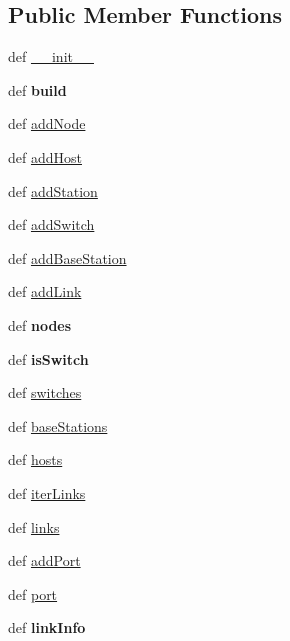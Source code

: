 \subsection*{Public Member Functions}
\begin{DoxyCompactItemize}
\item 
def \hyperlink{classmininet_1_1topo_1_1Topo_aa676f9d1a195133f173f73191aa3488b}{\-\_\-\-\_\-init\-\_\-\-\_\-}
\item 
\hypertarget{classmininet_1_1topo_1_1Topo_af49b0fef111262d6c0bd08e7977f9ffc}{def {\bfseries build}}\label{classmininet_1_1topo_1_1Topo_af49b0fef111262d6c0bd08e7977f9ffc}

\item 
def \hyperlink{classmininet_1_1topo_1_1Topo_ad49002a42e5525bbe9e0136d10d9b72d}{add\-Node}
\item 
def \hyperlink{classmininet_1_1topo_1_1Topo_a4649e48317e0b09f84ac5c6a88424194}{add\-Host}
\item 
def \hyperlink{classmininet_1_1topo_1_1Topo_acf5880d959db9ef7c3be45d1d6dfc72a}{add\-Station}
\item 
def \hyperlink{classmininet_1_1topo_1_1Topo_a8506ad67498aefb4a42ad1cd51576b38}{add\-Switch}
\item 
def \hyperlink{classmininet_1_1topo_1_1Topo_abf65ac2a53a0e0b0f27ac472723a1c37}{add\-Base\-Station}
\item 
def \hyperlink{classmininet_1_1topo_1_1Topo_ade9840eb4826cb17d5c6bc868e762fa3}{add\-Link}
\item 
\hypertarget{classmininet_1_1topo_1_1Topo_a4386138cc13f285c9c963367a492187d}{def {\bfseries nodes}}\label{classmininet_1_1topo_1_1Topo_a4386138cc13f285c9c963367a492187d}

\item 
\hypertarget{classmininet_1_1topo_1_1Topo_a47cc4a860b8806784fb84bb39f8212d8}{def {\bfseries is\-Switch}}\label{classmininet_1_1topo_1_1Topo_a47cc4a860b8806784fb84bb39f8212d8}

\item 
def \hyperlink{classmininet_1_1topo_1_1Topo_ac69689ade0c4416b7f1d726867e5034f}{switches}
\item 
def \hyperlink{classmininet_1_1topo_1_1Topo_a0f802790abc965ca8f775ae218e1dbb8}{base\-Stations}
\item 
def \hyperlink{classmininet_1_1topo_1_1Topo_a087a4818bbb5a1beba067fce4f009969}{hosts}
\item 
def \hyperlink{classmininet_1_1topo_1_1Topo_a900cec05bd380b32a60e0fc5371bcb29}{iter\-Links}
\item 
def \hyperlink{classmininet_1_1topo_1_1Topo_ad30a63eb5f3a910d331e33e34fe9adbb}{links}
\item 
def \hyperlink{classmininet_1_1topo_1_1Topo_ab83082737d1c8f4cba2da043a9ac91f9}{add\-Port}
\item 
def \hyperlink{classmininet_1_1topo_1_1Topo_af076ac0a3d9a21fbdb5703fc251c6fe8}{port}
\item 
\hypertarget{classmininet_1_1topo_1_1Topo_ae8e97604bcab29d2441e016311381aa6}{def {\bfseries link\-Info}}\label{classmininet_1_1topo_1_1Topo_ae8e97604bcab29d2441e016311381aa6}


\end{DoxyCompactItemize}
